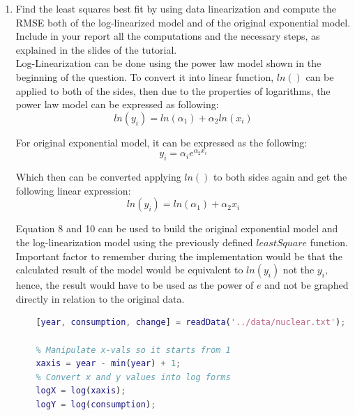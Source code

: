 \documentclass[unicode,11pt,a4paper,oneside,numbers=endperiod,openany]{scrartcl}
\begin{document}
\begin{enumerate}[label=(\alph*)]
 \item Find the least squares best fit by using data linearization and compute the RMSE both of the log-linearized
model and of the original exponential model. Include in your report all the computations and the necessary
steps, as explained in the slides of the tutorial. \\

Log-Linearization can be done using the power law model shown in the beginning of the question. To convert it into linear function, ${ln()}$ can be applied to both of the sides, then due to the properties of logarithms, the power law model can be expressed as following: \\

\begin{equation}
 ln(y_i) = ln(\alpha_1) + \alpha_2 ln(x_i)
\end{equation}

For original exponential model, it can be expressed as the following: \\

\begin{equation}
 y_i = \alpha_ie^{\alpha_2x_i}
\end{equation}

Which then can be converted applying ${ln()}$ to both sides again and get the following linear expression: \\

\begin{equation}
 ln(y_i) = ln(\alpha_1) + \alpha_2x_i
\end{equation}

Equation 8 and 10 can be used to build the original exponential model and the log-linearization model using the previously defined ${leastSquare}$ function. Important factor to remember during the implementation would be that the calculated result of the model would be equivalent to ${ln(y_i)}$ not the ${y_i}$, hence, the result would have to be used as the power of ${e}$ and not be graphed directly in relation to the original data. \\

\newpage

\begin{lstlisting}[language=Matlab]
    % Getting x = year and y = consumption data.
    [year, consumption, change] = readData('../data/nuclear.txt');
    
    % Manipulate x-vals so it starts from 1
    xaxis = year - min(year) + 1;
    % Convert x and y values into log forms
    logX = log(xaxis);
    logY = log(consumption);
    

\end{lstlisting}
\end{enumerate}
\end{document}
